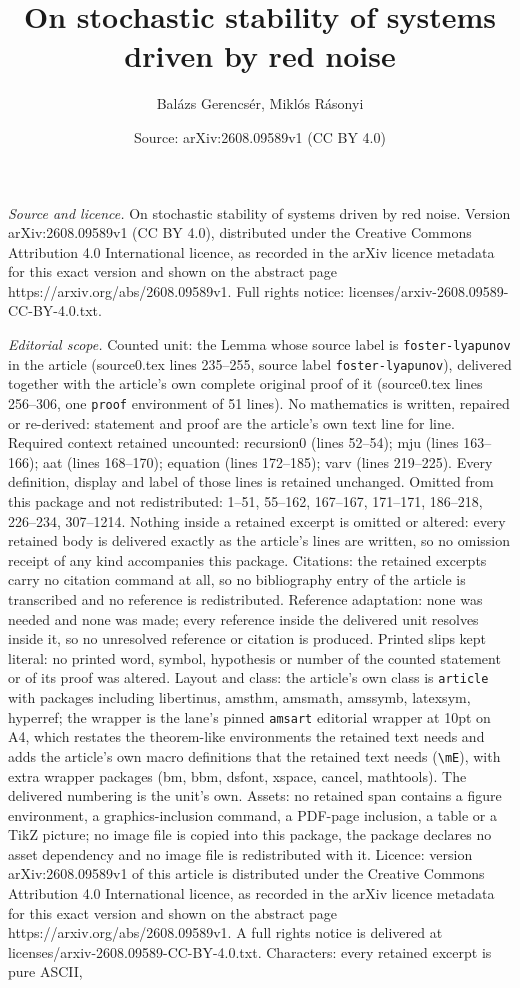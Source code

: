 \documentclass[10pt,a4paper]{amsart}
\title[On stochastic stability of systems driven by red noise]{On stochastic stability of systems driven by red noise}
\author{Bal\'azs Gerencs\'er, Mikl\'os R\'asonyi}
\date{Source: arXiv:2608.09589v1 (CC BY 4.0)}
\begin{document}
\maketitle

\noindent\emph{Source and licence.} On stochastic stability of systems driven by red noise. Version arXiv:2608.09589v1 (CC BY 4.0), distributed under the Creative Commons Attribution 4.0 International licence, as recorded in the arXiv licence metadata for this exact version and shown on the abstract page https://arxiv.org/abs/2608.09589v1. Full rights notice: licenses/arxiv-2608.09589-CC-BY-4.0.txt.\par\smallskip

\noindent\textit{Editorial scope.} Counted unit: the Lemma whose source label is \texttt{foster-lyapunov} in the article (source0.tex lines 235--255, source label \texttt{foster-lyapunov}), delivered together with the article's own complete original proof of it (source0.tex lines 256--306, one \texttt{proof} environment of 51 lines). No mathematics is written, repaired or re-derived: statement and proof are the article's own text line for line. Required context retained uncounted: recursion0 (lines 52--54); mju (lines 163--166); aat (lines 168--170); equation (lines 172--185); varv (lines 219--225). Every definition, display and label of those lines is retained unchanged. Omitted from this package and not redistributed: 1--51, 55--162, 167--167, 171--171, 186--218, 226--234, 307--1214. Nothing inside a retained excerpt is omitted or altered: every retained body is delivered exactly as the article's lines are written, so no omission receipt of any kind accompanies this package. Citations: the retained excerpts carry no citation command at all, so no bibliography entry of the article is transcribed and no reference is redistributed. Reference adaptation: none was needed and none was made; every reference inside the delivered unit resolves inside it, so no unresolved reference or citation is produced. Printed slips kept literal: no printed word, symbol, hypothesis or number of the counted statement or of its proof was altered. Layout and class: the article's own class is \texttt{article} with packages including libertinus, amsthm, amsmath, amssymb, latexsym, hyperref; the wrapper is the lane's pinned \texttt{amsart} editorial wrapper at 10pt on A4, which restates the theorem-like environments the retained text needs and adds the article's own macro definitions that the retained text needs (\texttt{\textbackslash mE}), with extra wrapper packages (bm, bbm, dsfont, xspace, cancel, mathtools). The delivered numbering is the unit's own. Assets: no retained span contains a figure environment, a graphics-inclusion command, a PDF-page inclusion, a table or a TikZ picture; no image file is copied into this package, the package declares no asset dependency and no image file is redistributed with it. Licence: version arXiv:2608.09589v1 of this article is distributed under the Creative Commons Attribution 4.0 International licence, as recorded in the arXiv licence metadata for this exact version and shown on the abstract page https://arxiv.org/abs/2608.09589v1. A full rights notice is delivered at licenses/arxiv-2608.09589-CC-BY-4.0.txt. Characters: every retained excerpt is pure ASCII, 
\end{document}
